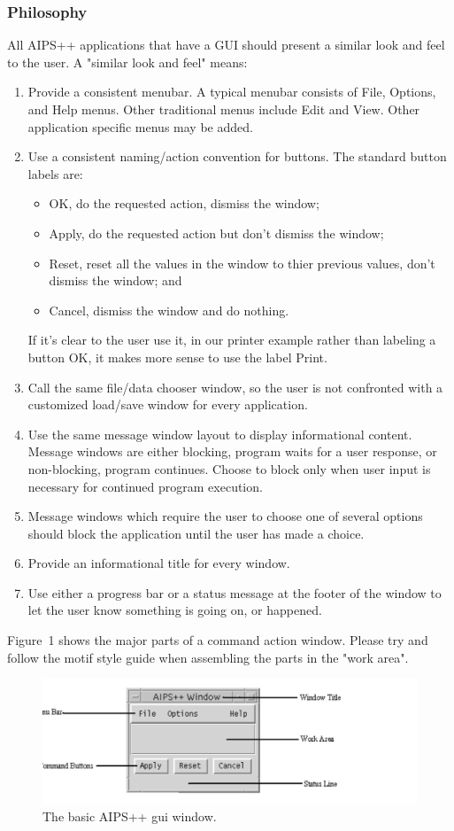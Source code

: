 \subsubsection{Philosophy}
All AIPS++ applications that have a GUI should present a similar look
and feel to the user.  A "similar look and feel" means:
\begin{enumerate}
\item Provide a consistent menubar.  A typical menubar consists of File, Options, and Help menus.  Other traditional menus include Edit and View.  Other 
application specific menus may be added.
\item Use a consistent naming/action convention for buttons.  The standard 
button labels are:
\begin{itemize}
\item OK, do the requested action, dismiss the window;
\item Apply, do the requested action but don't dismiss the window;
\item Reset, reset all the values in the window to thier previous values,
don't dismiss the window; and
\item Cancel, dismiss the window and do nothing.
\end{itemize}
If it's clear to the user use it, in our
printer example rather
than labeling a button OK, it makes more sense to use the label Print.
\item Call the same file/data chooser window, so the user is not confronted
with a customized load/save window for every application.
\item Use the same message window layout to display informational content.  
Message windows are either blocking, program waits for a user response, or non-blocking, program continues.  Choose to block only when user input is necessary
for continued program execution.
\item Message windows which require the user to choose one of several options
should block the application until the user has made a choice.
\item Provide an informational title for every window.
\item Use either a progress bar or a status message at the footer of the window
to let the user know something is going on, or happened.
\end{enumerate}
Figure~1 shows the major parts of a command action window.  Please try and
follow the motif style guide when assembling the parts in the "work area".
\begin{figure}[here]
\includegraphics{aips2gui}
\caption{The basic AIPS++ gui window.}
\end{figure}
